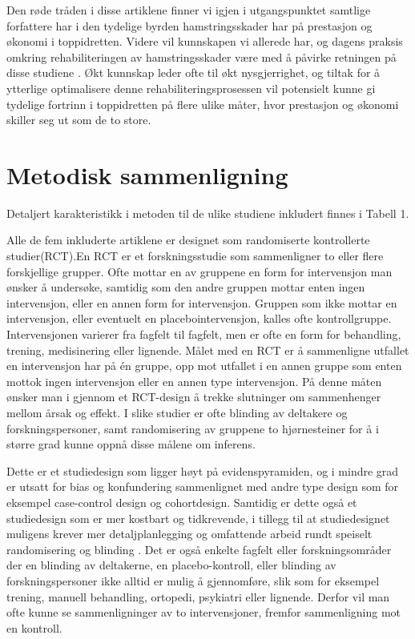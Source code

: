 \documentclass[
]{book}
\begin{document}
Den røde tråden i disse artiklene finner vi igjen i utgangspunktet samtlige forfattere har i den tydelige byrden hamstringsskader har på prestasjon og økonomi i toppidretten\citep{ekstrand2011, hickey2014, eirale2013}. Videre vil kunnskapen vi allerede har, og dagens praksis omkring rehabiliteringen av hamstringsskader være med å påvirke retningen på disse studiene \citep{brooks2006, horst2017, opar2012, podlog2014}. Økt kunnskap leder ofte til økt nysgjerrighet, og tiltak for å ytterlige optimalisere denne rehabiliteringsprosessen vil potensielt kunne gi tydelige fortrinn i toppidretten på flere ulike måter, hvor prestasjon og økonomi skiller seg ut som de to store.

\hypertarget{metodisk-sammenligning}{%
\section{Metodisk sammenligning}\label{metodisk-sammenligning}}

Detaljert karakteristikk i metoden til de ulike studiene inkludert finnes i Tabell 1.

Alle de fem inkluderte artiklene er designet som randomiserte kontrollerte studier(RCT)\citep{askling2014, askling2013, hickey2020, ahamid2014, hamilton2015}.En RCT er et forskningsstudie som sammenligner to eller flere forskjellige grupper\citep[s 137-139.]{hulley2013}. Ofte mottar en av gruppene en form for intervensjon man ønsker å undersøke, samtidig som den andre gruppen mottar enten ingen intervensjon, eller en annen form for intervensjon. Gruppen som ikke mottar en intervensjon, eller eventuelt en placebointervensjon, kalles ofte kontrollgruppe. Intervensjonen varierer fra fagfelt til fagfelt, men er ofte en form for behandling, trening, medisinering eller lignende. Målet med en RCT er å sammenligne utfallet en intervensjon har på én gruppe, opp mot utfallet i en annen gruppe som enten mottok ingen intervensjon eller en annen type intervensjon. På denne måten ønsker man i gjennom et RCT-design å trekke slutninger om sammenhenger mellom årsak og effekt\citep[s. 121]{hulley2017}. I slike studier er ofte blinding av deltakere og forskningspersoner, samt randomisering av gruppene to hjørnesteiner for å i større grad kunne oppnå disse målene om inferens\citep[s.138-140]{hulley2017}.

Dette er et studiedesign som ligger høyt på evidenspyramiden, og i mindre grad er utsatt for bias og konfundering sammenlignet med andre type design som for eksempel case-control design og cohortdesign\citep[s.109-110]{hulley2017}. Samtidig er dette også et studiedesign som er mer kostbart og tidkrevende, i tillegg til at studiedesignet muligens krever mer detaljplanlegging og omfattende arbeid rundt speiselt randomisering og blinding \citep[s.139-141]{hulley2017}. Det er også enkelte fagfelt eller forskningsområder der en blinding av deltakerne, en placebo-kontroll, eller blinding av forskningspersoner ikke alltid er mulig å gjennomføre, slik som for eksempel trening, manuell behandling, ortopedi, psykiatri eller lignende. Derfor vil man ofte kunne se sammenligninger av to intervensjoner, fremfor sammenligning mot en kontroll\citep[s.137-139]{hulley2017}.
\end{document}
